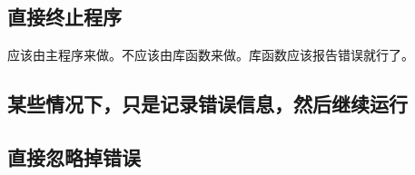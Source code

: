 \hypertarget{ux76f4ux63a5ux7ec8ux6b62ux7a0bux5e8f}{%
\subsection{直接终止程序}\label{ux76f4ux63a5ux7ec8ux6b62ux7a0bux5e8f}}

\begin{Shaded}
\end{Shaded}

应该由主程序来做。不应该由库函数来做。库函数应该报告错误就行了。

\begin{Shaded}
\begin{Highlighting}[]
\end{Highlighting}
\end{Shaded}

\hypertarget{ux67d0ux4e9bux60c5ux51b5ux4e0bux53eaux662fux8bb0ux5f55ux9519ux8befux4fe1ux606fux7136ux540eux7ee7ux7eedux8fd0ux884c}{%
\subsection{某些情况下，只是记录错误信息，然后继续运行}\label{ux67d0ux4e9bux60c5ux51b5ux4e0bux53eaux662fux8bb0ux5f55ux9519ux8befux4fe1ux606fux7136ux540eux7ee7ux7eedux8fd0ux884c}}

\begin{Shaded}
\end{Shaded}

\hypertarget{ux76f4ux63a5ux5ffdux7565ux6389ux9519ux8bef}{%
\subsection{直接忽略掉错误}\label{ux76f4ux63a5ux5ffdux7565ux6389ux9519ux8bef}}

